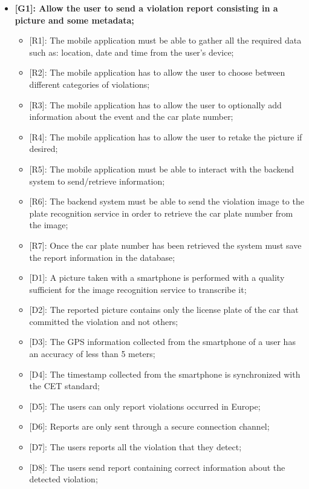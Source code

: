\begin{itemize}
  \item \textbf{{[G1]}: Allow the user to send a violation report consisting in a picture and some metadata;}
    \begin{itemize}
      \item {[R1]}: The mobile application must be able to gather all the required data such as: location, date and time from the user's device;
      \item {[R2]}: The mobile application has to allow the user to choose between different categories of violations;
      \item {[R3]}: The mobile application has to allow the user to optionally add information about the event and the car plate number;
      \item {[R4]}: The mobile application has to allow the user to retake the picture if desired;
      \item {[R5]}: The mobile application must be able to interact with the backend system to send/retrieve information;
      \item {[R6]}: The backend system must be able to send the violation image to the plate recognition service in order to retrieve the car plate number from the image;
      \item {[R7]}: Once the car plate number has been retrieved the system must save the report information in the database;
      \item {[D1]}: A picture taken with a smartphone is performed with a quality sufficient for the image recognition service to transcribe it;
      \item {[D2]}: The reported picture contains only the license plate of the car that committed the violation and not others;
      \item {[D3]}: The GPS information collected from the smartphone of a user has an accuracy of less than 5 meters;
      \item {[D4]}: The timestamp collected from the smartphone is synchronized with the CET standard;
      \item {[D5]}: The users can only report violations occurred in Europe;
      \item {[D6]}: Reports are only sent through a secure connection channel;
      \item {[D7]}: The users reports all the violation that they detect;
      \item {[D8]}: The users send report containing correct information about the detected violation;

\end{itemize}
\end{itemize}
